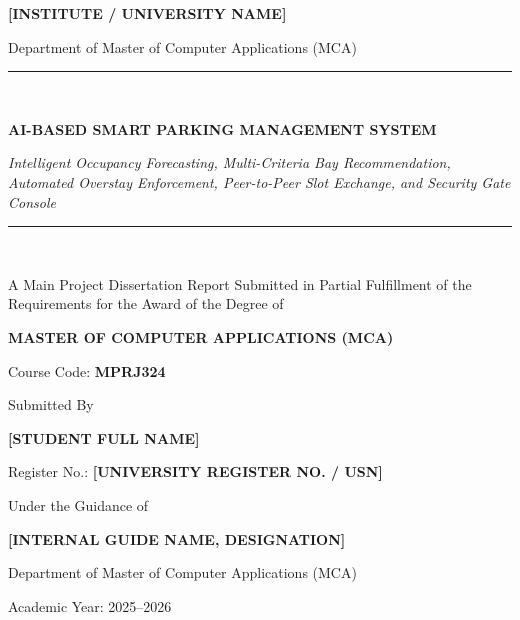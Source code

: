 \documentclass[12pt,a4paper,oneside]{report}
\newcommand{\studentname}{[STUDENT FULL NAME]}
\newcommand{\studentusn}{[UNIVERSITY REGISTER NO. / USN]}
\newcommand{\guidename}{[INTERNAL GUIDE NAME, DESIGNATION]}
\newcommand{\collegename}{[INSTITUTE / UNIVERSITY NAME]}
\newcommand{\deptname}{Department of Master of Computer Applications (MCA)}
\newcommand{\academicyear}{2025--2026}
\begin{document}
\onehalfspacing


\begin{titlepage}
  \centering
  \vspace*{0.4cm}
  {\Large\bfseries \collegename \par}
  \vspace{0.2cm}
  {\large \deptname \par}
  \vspace{1.0cm}
  \rule{\textwidth}{1.5pt}\\[0.4cm]
  {\Huge\bfseries\color{primaryblue} AI-BASED SMART PARKING MANAGEMENT SYSTEM \par}
  \vspace{0.25cm}
  {\large\textit{Intelligent Occupancy Forecasting, Multi-Criteria Bay Recommendation, Automated Overstay Enforcement, Peer-to-Peer Slot Exchange, and Security Gate Console} \par}
  \rule{\textwidth}{1.5pt}\\[1.0cm]

  {\large A Main Project Dissertation Report Submitted in Partial Fulfillment of the Requirements for the Award of the Degree of \par}
  \vspace{0.3cm}
  {\Large\bfseries MASTER OF COMPUTER APPLICATIONS (MCA) \par}
  \vspace{0.2cm}
  {\large Course Code: \textbf{MPRJ324} \par}

  \vspace{1.0cm}
  {\large Submitted By \par}
  \vspace{0.2cm}
  {\Large\bfseries \studentname \par}
  {\large Register No.: \textbf{\studentusn} \par}

  \vspace{1.0cm}
  {\large Under the Guidance of \par}
  \vspace{0.2cm}
  {\Large\bfseries \guidename \par}
  {\normalsize \deptname \par}

  \vfill
  {\large Academic Year: \academicyear \par}
\end{titlepage}
\end{document}
